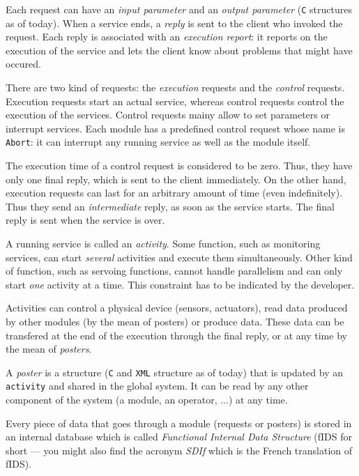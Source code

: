 Each request can  have an {\em  input parameter} and an  {\em
output parameter} ({\tt C} structures as  of today). When a service ends,
a   {\em  reply} is sent to   the   client who invoked  the 
request. Each reply  is  associated with an  {\em  execution  report}:  it
reports on the execution of  the service and  lets  the client  know about
problems that might have occured.

There are two kind of requests: the {\em execution} requests and the {\em
control} requests. Execution requests  start  an actual service,  whereas
control requests control the  execution of the services. Control requests
mainy allow to set parameters or  interrupt services. Each module has  a
predefined control request whose name  is  {\tt Abort}: it can  interrupt
any running service as well as the module itself.

The execution time of  a control request  is considered to be zero. Thus,
they have only one final reply, which is  sent to the client immediately.
On the other hand, execution requests can last for an arbitrary amount of
time (even indefinitely). Thus they send an {\em intermediate} reply,  as
soon as the service 
starts.  The final reply is sent when the service is over.

A running  service is called an   {\em activity}. Some function,  such as
monitoring services,  can start {\em several}  activities and  execute them
simultaneously. Other  kind   of function,  such as   servoing functions,
cannot handle  parallelism  and can only  start  {\em one} activity at  a
time. This constraint has to be indicated by the developer.

Activities can control a physical device (sensors, actuators), read  data
produced by  other modules (by  the mean of  posters) or produce
data. These data can  be transfered at the end  of the  execution through
the final reply, or at any time by the mean of {\em posters}.

A {\em  poster} is a structure ({\tt  C} and {\tt XML} structure as  of  
today) that is
updated by an {\tt activity} and shared in the global system. It can be read by
any other component of the system (a module, an operator, ...) at any time.

Every piece  of data that goes through  a module (requests or posters) is
stored  in an internal database  which is called {\em Functional Internal
Data Structure} (fIDS  for short --- you might  also find the acronym
{\em SDIf} which is the French translation of fIDS).

